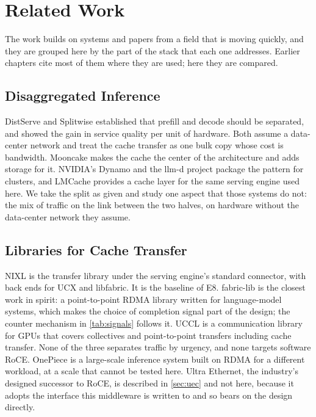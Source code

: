 \chapter{Related Work}
\label{ch:related}

The work builds on systems and papers from a field that is moving quickly,
and they are grouped here by the part of the stack that each one addresses.
Earlier chapters cite most of them where they are used; here they are
compared.

\section{Disaggregated Inference}

DistServe \citep{zhong2024distserve} and Splitwise \citep{patel2024splitwise}
established that prefill and decode should be separated, and showed the gain
in service quality per unit of hardware. Both assume a data-center network
and treat the cache transfer as one bulk copy whose cost is bandwidth.
Mooncake \citep{qin2024mooncake} makes the cache the center of the
architecture and adds storage for it. NVIDIA's Dynamo \citep{dynamo} and the
llm-d project \citep{llmd} package the pattern for clusters, and LMCache
\citep{lmcache2025,lmcache_blog} provides a cache layer for the same serving
engine used here. We take the split as given and study one aspect that those systems do not: the mix of traffic on the link between the two halves,
on hardware without the data-center network they assume.

\section{Libraries for Cache Transfer}

NIXL \citep{nixl} is the transfer library under the serving engine's standard
connector, with back ends for UCX and libfabric. It is the baseline of E8.
fabric-lib \citep{licker2026fabriclib} is the closest work in spirit: a
point-to-point RDMA library written for language-model systems, which makes
the choice of completion signal part of the design; the counter mechanism in
\cref{tab:signals} follows it. UCCL \citep{uccl} is a communication library
for GPUs that covers collectives and point-to-point transfers including cache
transfer. None of the three separates traffic by urgency, and none targets
software RoCE. OnePiece \citep{chen2026onepiece} is a large-scale inference
system built on RDMA for a different workload, at a scale that cannot be tested here. Ultra Ethernet, the industry's designed successor to RoCE, is described
in \cref{sec:uec} and not here, because it adopts the interface this
middleware is written to and so bears on the design directly.

